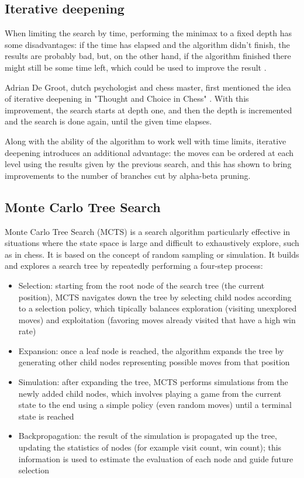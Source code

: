 \subsection{Iterative deepening}
\label{subsec:ch2sec2subsec4}

When limiting the search by time, performing the minimax to a fixed depth has some disadvantages: if the time has elapsed and the algorithm didn't finish, the results are probably bad, but, on the other hand, if the algorithm finished there might still be some time left, which could be used to improve the result \cite{carolus2006alpha}.

Adrian De Groot, dutch psychologist and chess master, first mentioned the idea of iterative deepening in "Thought and Choice in Chess" \cite{thought2014groot}. With this improvement, the search starts at depth one, and then the depth is incremented and the search is done again, until the given time elapses.

Along with the ability of the algorithm to work well with time limits, iterative deepening introduces an additional advantage: the moves can be ordered at each level using the results given by the previous search, and this has shown to bring improvements to the number of branches cut by alpha-beta pruning.

\subsection{Monte Carlo Tree Search}
\label{subsec:ch2sec2subsec5}

Monte Carlo Tree Search (MCTS) is a search algorithm particularly effective in situations where the state space is large and difficult to exhaustively explore, such as in chess. It is based on the concept of random sampling or simulation. It builds and explores a search tree by repeatedly performing a four-step process:
\begin{itemize}
    \item Selection: starting from the root node of the search tree (the current position), MCTS navigates down the tree by selecting child nodes according to a selection policy, which tipically balances exploration (visiting unexplored moves) and exploitation (favoring moves already visited that have a high win rate)
    \item Expansion: once a leaf node is reached, the algorithm expands the tree by generating other child nodes representing possible moves from that position
    \item Simulation: after expanding the tree, MCTS performs simulations from the newly added child nodes, which involves playing a game from the current state to the end using a simple policy (even random moves) until a terminal state is reached
    \item Backpropagation: the result of the simulation is propagated up the tree, updating the statistics of nodes (for example visit count, win count); this information is used to estimate the evaluation of each node and guide future selection
\end{itemize}

